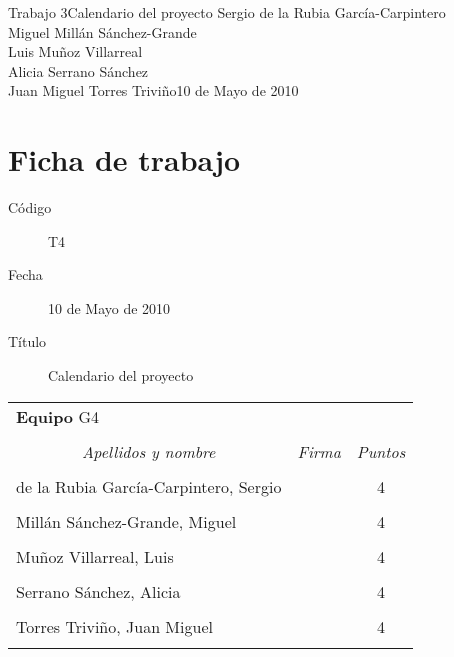 \documentclass[11pt,a4paper,spanish,twoside]{book}
\begin{document}


{Trabajo 3}{Calendario del proyecto}
{Sergio de la Rubia García-Carpintero\\Miguel Millán Sánchez-Grande\\
  Luis Muñoz Villarreal\\Alicia Serrano Sánchez\\
  Juan Miguel Torres Triviño}{10 de Mayo de 2010}


\chapter*{Ficha de trabajo}
\begin{description}
\item[Código] T4
\item[Fecha] 10 de Mayo de 2010
\item[Título] Calendario del proyecto
\end{description}

\begin{table}[!ht]
  \centering
  \begin{tabular}{lp{5cm}c}
    \multicolumn{3}{l}{\Large \textbf{Equipo} G4} \\ \\
    \multicolumn{1}{c}{\emph{Apellidos y nombre}} & 
    \multicolumn{1}{c}{\emph{Firma}} & \emph{Puntos} \\
    \hline \\
    de la Rubia García-Carpintero, Sergio & & 4 \\ \\
    Millán Sánchez-Grande, Miguel         & & 4 \\ \\
    Muñoz Villarreal, Luis                & & 4 \\ \\
    Serrano Sánchez, Alicia               & & 4 \\ \\
    Torres Triviño, Juan Miguel           & & 4 \\ \\
    \hline
  \end{tabular}
\end{table}
\end{document}
